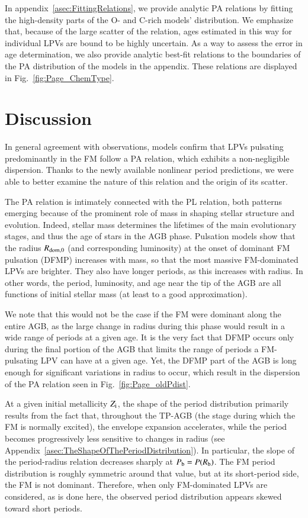 \documentclass[letter]{aa}
\newcommand{\Zi}{Z_{\rm i}}
\newcommand{\Rdom}{R_{\rm dom,0}}
\newcommand{\Rb}{R_{\rm b}}
\newcommand{\Pb}{P_{\rm b}}
\begin{document}
 In appendix~\ref{asec:FittingRelations}, we provide analytic PA relations by fitting the high-density parts of the O- and C-rich models' distribution. We emphasize that, because of the large scatter of the relation, ages estimated in this way for individual LPVs are bound to be highly uncertain. As a way to assess the error in age determination, we also provide analytic best-fit relations to the boundaries of the PA distribution of the models in the appendix. These relations are displayed in Fig.~\ref{fig:Page_ChemType}.

\section{Discussion}
\label{sec:Discussion}

In general agreement with observations, models confirm that LPVs pulsating predominantly in the FM follow a PA relation, which exhibits a non-negligible dispersion. Thanks to the newly available nonlinear period predictions, we were able to better examine the nature of this relation and the origin of its scatter.

The PA relation is intimately connected with the PL relation, both patterns emerging because of the prominent role of mass in shaping stellar structure and evolution. Indeed, stellar mass determines the lifetimes of the main evolutionary stages, and thus the age of stars in the AGB phase. Pulsation models \citep{Trabucchi_etal_2021} show that the radius $\Rdom$ (and corresponding luminosity) at the onset of dominant FM pulsation (DFMP) increases with mass, so that the most massive FM-dominated LPVs are brighter. They also have longer periods, as this increases with radius. In other words, the period, luminosity, and age near the tip of the AGB are all functions of initial stellar mass (at least to a good approximation).

We note that this would not be the case if the FM were dominant along the entire AGB, as the large change in radius during this phase would result in a wide range of periods at a given age. It is the very fact that DFMP occurs only during the final portion of the AGB that limits the range of periods a FM-pulsating LPV can have at a given age. Yet, the DFMP part of the AGB is long enough for significant variations in radius to occur, which result in the dispersion of the PA relation seen in Fig.~\ref{fig:Page_oldPdist}.

At a given initial metallicity $\Zi$, the shape of the period distribution primarily results from the fact that, throughout the TP-AGB (the stage during which the FM is normally excited), the envelope expansion accelerates, while the period becomes progressively less sensitive to changes in radius (see Appendix~\ref{asec:TheShapeOfThePeriodDistribution}). In particular, the slope of the period-radius relation decreases sharply at $\Pb=P(\Rb)$. The FM period distribution is roughly symmetric around that value, but at its short-period side, the FM is not dominant. Therefore, when only FM-dominated LPVs are considered, as is done here, the observed period distribution appears skewed toward short periods.
\end{document}
